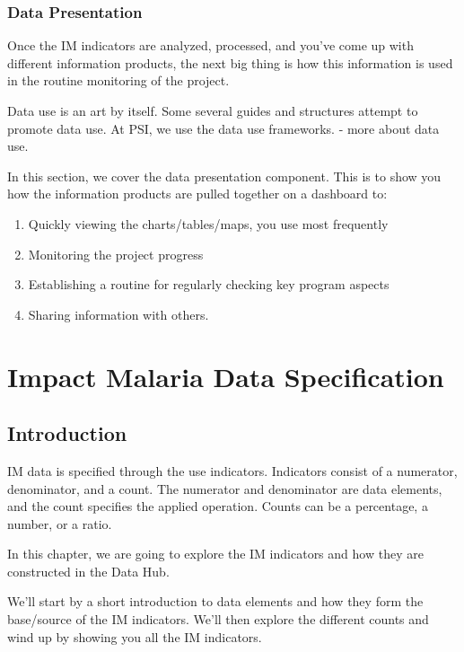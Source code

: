 \documentclass[]{book}
\providecommand{\tightlist}{%
  \setlength{\itemsep}{0pt}\setlength{\parskip}{0pt}}
\begin{document}
\hypertarget{data-presentation}{%
\subsection{Data Presentation}\label{data-presentation}}

Once the IM indicators are analyzed, processed, and you've come up with different information products, the next big thing is how this information is used in the routine monitoring of the project.

Data use is an art by itself. Some several guides and structures attempt to promote data use. At PSI, we use the data use frameworks. - more about data use.

In this section, we cover the data presentation component. This is to show you how the information products are pulled together on a dashboard to:

\begin{enumerate}
\def\labelenumi{\arabic{enumi}.}
\tightlist
\item
  Quickly viewing the charts/tables/maps, you use most frequently
\item
  Monitoring the project progress
\item
  Establishing a routine for regularly checking key program aspects
\item
  Sharing information with others.
\end{enumerate}

\hypertarget{data}{%
\chapter{Impact Malaria Data Specification}\label{data}}

\hypertarget{introduction-1}{%
\section{Introduction}\label{introduction-1}}

IM data is specified through the use indicators. Indicators consist of a numerator, denominator, and a count. The numerator and denominator are data elements, and the count specifies the applied operation. Counts can be a percentage, a number, or a ratio.

In this chapter, we are going to explore the IM indicators and how they are constructed in the Data Hub.

We'll start by a short introduction to data elements and how they form the base/source of the IM indicators. We'll then explore the different counts and wind up by showing you all the IM indicators.
\end{document}
